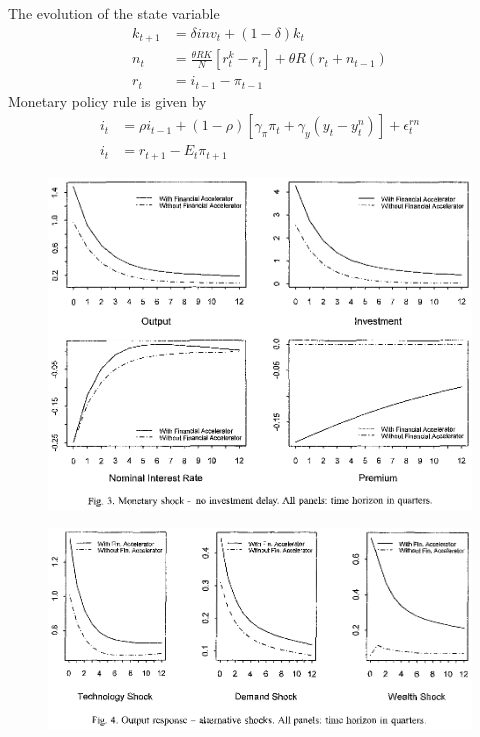 \documentclass{beamer}
\begin{document}
\begin{frame}
  The evolution of the state variable 
\begin{align}
  k_{t+1} &= \delta inv_t + (1-\delta)k_t\\
  n_t &= \frac{\theta RK}{N}[r_ t^k - r_t] + \theta R(r_t+n_{t-1})\\
  r_t &= i_{t-1} - \pi_{t-1}
\end{align}
\medskip
Monetary policy rule is given by
\begin{align}
  i_t &= \rho i_{t-1} + (1-\rho)[\gamma_{\pi}\pi_t + \gamma_y(y_t - y_t^n)]+ \epsilon_t^{rn}\\
  i_t &= r_{t+1} - E_t\pi_{t+1}
\end{align}
\end{frame}

\begin{frame}
 \begin{figure}
   \includegraphics{bernanke.eps}
 \end{figure}  
\end{frame}

\begin{frame}
 \begin{figure}
   \includegraphics{bernanke2.eps}
 \end{figure}  
\end{frame}
\end{document}
